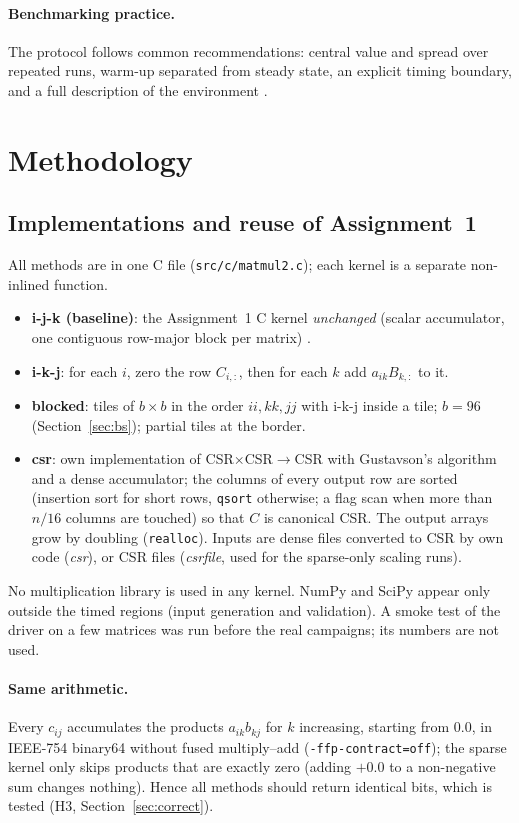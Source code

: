 \paragraph{Benchmarking practice.} The protocol follows common recommendations: central value and spread over repeated runs, warm-up separated
from steady state, an explicit timing boundary, and a full description of the environment \cite{georges,hoefler}.

\section{Methodology}

\subsection{Implementations and reuse of Assignment~1}
\label{sec:impl}
All methods are in one C file (\texttt{src/c/matmul2.c}); each kernel is a separate non-inlined function.
\begin{itemize}
  \item \textbf{i-j-k (baseline)}: the Assignment~1 C kernel \emph{unchanged} (scalar accumulator, one contiguous row-major block per matrix) \cite{a1}.
  \item \textbf{i-k-j}: for each $i$, zero the row $C_{i,:}$, then for each $k$ add $a_{ik}B_{k,:}$ to it.
  \item \textbf{blocked}: tiles of $b\times b$ in the order $ii,kk,jj$ with i-k-j inside a tile; $b=96$ (Section~\ref{sec:bs}); partial tiles at the border.
  \item \textbf{csr}: own implementation of CSR$\times$CSR$\to$CSR with Gustavson's algorithm and a dense accumulator; the columns of every output row
        are sorted (insertion sort for short rows, \texttt{qsort} otherwise; a flag scan when more than $n/16$ columns are touched) so that $C$ is canonical CSR.
        The output arrays grow by doubling (\texttt{realloc}). Inputs are dense files converted to CSR by own code (\emph{csr}), or CSR files (\emph{csrfile},
        used for the sparse-only scaling runs).
\end{itemize}
No multiplication library is used in any kernel. NumPy and SciPy appear only outside the timed regions (input generation and validation). A
smoke test of the driver on a few matrices was run before the real campaigns; its numbers are not used.

\paragraph{Same arithmetic.} Every $c_{ij}$ accumulates the products $a_{ik}b_{kj}$ for $k$ increasing, starting from $0.0$, in IEEE-754 binary64
without fused multiply--add (\texttt{-ffp-contract=off}); the sparse kernel only skips products that are exactly zero (adding $+0.0$ to a non-negative sum
changes nothing). Hence all methods should return identical bits, which is tested (H3, Section~\ref{sec:correct}).

